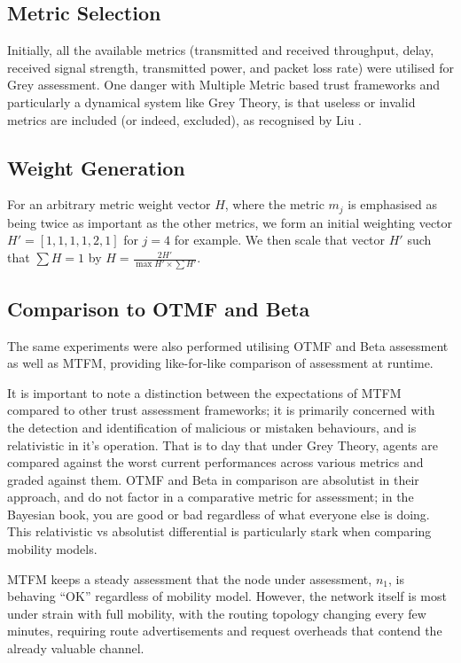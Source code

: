 \documentclass[runningheads,a4paper]{llncs}
\begin{document}
{{\subsection{Metric Selection}

Initially, all the available metrics (transmitted and received throughput, delay, received signal strength, transmitted power, and packet loss rate) were utilised for Grey assessment. 
One danger with Multiple Metric based trust frameworks and particularly a dynamical system like Grey Theory, is that useless or invalid metrics are included (or indeed, excluded), as recognised by Liu \cite{Liu2011}.

\subsection{Weight Generation}

For an arbitrary metric weight vector $H$, where the metric $m_j$ is emphasised as being twice as important as the other metrics, we form an initial weighting vector $H' = [1,1,1,1,2,1]$ for $j=4$ for example. We then scale that vector $H'$ such that $\sum H = 1$ by $H= \frac{2 H'}{\max{H'}\times \sum H'}$.




\subsection{Comparison to OTMF and Beta}

The same experiments were also performed utilising OTMF and Beta assessment as well as MTFM, providing like-for-like comparison of assessment at runtime.

It is important to note a distinction between the expectations of MTFM compared to other trust assessment frameworks; it is primarily concerned with the detection and identification of malicious or mistaken behaviours, and is relativistic in it's operation.
That is to day that under Grey Theory, agents are compared against the worst current performances across various metrics and graded against them.
OTMF and Beta in comparison are absolutist in their approach, and do not factor in a comparative metric for assessment; in the Bayesian book, you are good or bad regardless of what everyone else is doing. 
This relativistic vs absolutist differential is particularly stark when comparing mobility models. 

MTFM keeps a steady assessment that the node under assessment, $n_1$, is behaving ``OK'' regardless of mobility model. 
However, the network itself is most under strain with full mobility, with the routing topology changing every few minutes, requiring route advertisements and request overheads that contend the already valuable channel.

}}
\end{document}
